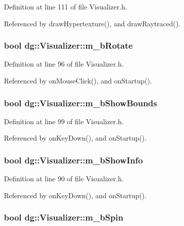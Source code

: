 Definition at line 111 of file Visualizer.h.

Referenced by draw\-Hypertexture(), and draw\-Raytraced().
\subsubsection{\setlength{\rightskip}{0pt plus 5cm}bool dg::Visualizer::m\_\-b\-Rotate\hspace{0.3cm}{\tt  [protected]}}\label{classdg_1_1Visualizer_n8}




Definition at line 96 of file Visualizer.h.

Referenced by on\-Mouse\-Click(), and on\-Startup().
\subsubsection{\setlength{\rightskip}{0pt plus 5cm}bool dg::Visualizer::m\_\-b\-Show\-Bounds\hspace{0.3cm}{\tt  [protected]}}\label{classdg_1_1Visualizer_n9}




Definition at line 99 of file Visualizer.h.

Referenced by on\-Key\-Down(), and on\-Startup().
\subsubsection{\setlength{\rightskip}{0pt plus 5cm}bool dg::Visualizer::m\_\-b\-Show\-Info\hspace{0.3cm}{\tt  [protected]}}\label{classdg_1_1Visualizer_n6}




Definition at line 90 of file Visualizer.h.

Referenced by on\-Key\-Down(), and on\-Startup().
\subsubsection{\setlength{\rightskip}{0pt plus 5cm}bool dg::Visualizer::m\_\-b\-Spin\hspace{0.3cm}{\tt  [protected]}}\label{classdg_1_1Visualizer_n10}




